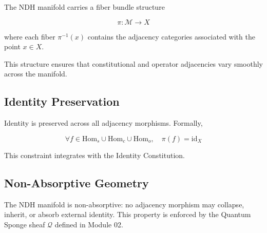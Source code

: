 The NDH manifold carries a fiber bundle structure

\[
\pi : \mathcal{M} \to X
\]

where each fiber $\pi^{-1}(x)$ contains the adjacency categories associated
with the point $x \in X$.

This structure ensures that constitutional and operator adjacencies vary
smoothly across the manifold.


\subsection{Identity Preservation}

Identity is preserved across all adjacency morphisms. Formally,

\[
\forall f \in \mathrm{Hom}_s \cup \mathrm{Hom}_c \cup \mathrm{Hom}_o,\quad
\pi(f) = \mathrm{id}_X
\]

This constraint integrates with the Identity Constitution.


\subsection{Non-Absorptive Geometry}

The NDH manifold is non-absorptive: no adjacency morphism may collapse,
inherit, or absorb external identity. This property is enforced by the
Quantum Sponge sheaf $\mathcal{Q}$ defined in Module 02.

